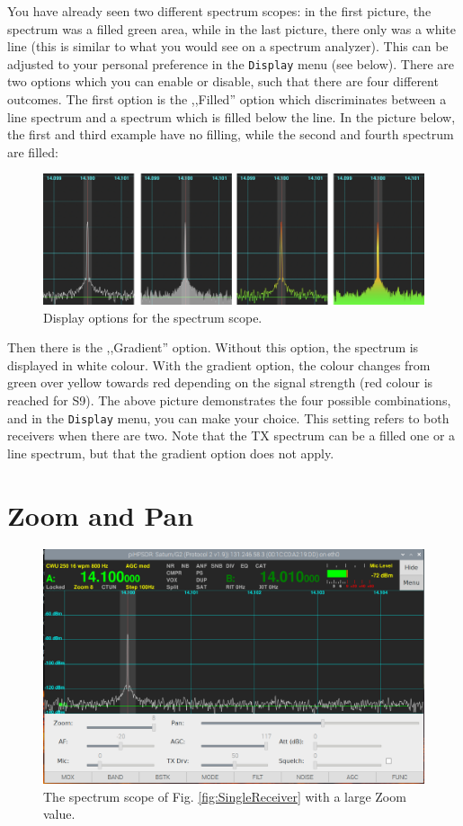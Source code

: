 \documentclass[12pt]{book}
\def\bltt#1{\texttt{\color{blue}#1}}
\begin{document}
You have already seen two different spectrum scopes: in the first
picture, the  spectrum was a filled green area, while in the last
picture, there only was a white line (this is similar to what you
would see on a spectrum analyzer). This can be adjusted to your
personal preference in the \bltt{Display} menu (see below). There
are two options which you can enable or disable, such that there
are four different outcomes. The first option is the ,,Filled'' option
which discriminates between a line spectrum and a spectrum which is
filled below the line. In the picture below, the first and third
example have no filling, while the second and fourth spectrum
are filled:

\begin{figure}[h]
\center
\includegraphics[width=12cm]{ScopeFilling.png}
\caption{Display options for the spectrum scope.}
\end{figure}

Then there is the ,,Gradient'' option. Without this option, the
spectrum is displayed in white colour. With the gradient option,
the colour changes from green over yellow towards red depending
on the signal strength (red colour is reached for S9). The above
picture demonstrates the four possible combinations, and in
the \bltt{Display} menu, you can make your choice. This setting
refers to both receivers when there are two. Note that the TX
spectrum can be a filled one or a line spectrum, but that the
gradient option does not apply.

\section{Zoom and Pan}

\begin{figure}[h]
\center
\includegraphics[width=12cm]{ZoomPan.png}
\caption{The spectrum scope of Fig. \ref{fig:SingleReceiver} with a
large Zoom value.}
\end{figure}
\end{document}
